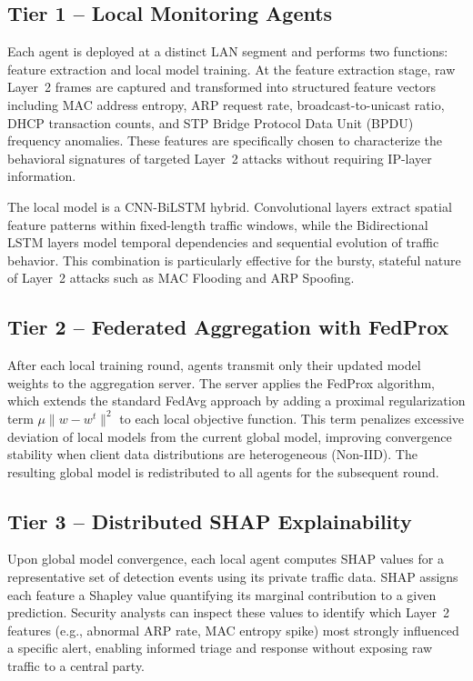 \documentclass[conference]{IEEEtran}
\begin{document}
\subsection{Tier 1 -- Local Monitoring Agents}

Each agent is deployed at a distinct LAN segment and performs two functions: feature
extraction and local model training. At the feature extraction stage, raw Layer~2
frames are captured and transformed into structured feature vectors including MAC
address entropy, ARP request rate, broadcast-to-unicast ratio, DHCP transaction
counts, and STP Bridge Protocol Data Unit (BPDU) frequency anomalies. These features
are specifically chosen to characterize the behavioral signatures of targeted Layer~2
attacks without requiring IP-layer information.

The local model is a CNN-BiLSTM hybrid. Convolutional layers extract spatial feature
patterns within fixed-length traffic windows, while the Bidirectional LSTM layers
model temporal dependencies and sequential evolution of traffic behavior. This
combination is particularly effective for the bursty, stateful nature of Layer~2
attacks such as MAC Flooding and ARP Spoofing.

\subsection{Tier 2 -- Federated Aggregation with FedProx}

After each local training round, agents transmit only their updated model weights to
the aggregation server. The server applies the FedProx algorithm, which extends the
standard FedAvg approach by adding a proximal regularization term $\mu \| w - w^t \|^2$
to each local objective function. This term penalizes excessive deviation of local
models from the current global model, improving convergence stability when client data
distributions are heterogeneous (Non-IID). The resulting global model is redistributed
to all agents for the subsequent round.

\subsection{Tier 3 -- Distributed SHAP Explainability}

Upon global model convergence, each local agent computes SHAP values for a
representative set of detection events using its private traffic data. SHAP assigns
each feature a Shapley value quantifying its marginal contribution to a given
prediction. Security analysts can inspect these values to identify which Layer~2
features (e.g., abnormal ARP rate, MAC entropy spike) most strongly influenced a
specific alert, enabling informed triage and response without exposing raw traffic
to a central party.
\end{document}
